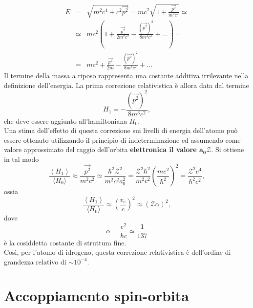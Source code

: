 \begin{eqnarray} 
E & = &\sqrt{m^2c^4+c^2\vec{p^2}}= mc^2 \sqrt{1+ \frac{\vec{p^2}}{m^2c^2}} \simeq \nonumber  \\
& \simeq & mc^2 \left( 1+ \frac{\vec{p^2}}{2m^2c^2}-\frac{(\vec{p^2})^2}{8m^4c^4}+\dots \right) = \nonumber  \\
& = & mc^2+\frac{\vec{p^2}}{2m}-\frac{(\vec{p^2})^2}{8m^3c^2}+ \dots 
\end{eqnarray}
Il termine della massa a riposo rappresenta una costante additiva irrilevante nella definizione dell'energia. La prima correzione relativistica è allora data dal termine 
\begin{equation} \label{eq:cap25_2}
H_1=-\frac{(\vec{p^2})^2}{8m^3c^2} ,
\end{equation}
che deve essere aggiunto all'hamiltoniana $H_0$. \\
Una stima dell'effetto di questa correzione sui livelli di energia dell'atomo può essere ottenuto utilizzando il principio di indeterminazione ed assumendo come valore approssimato del raggio dell'orbita \textbf{elettronica il valore $\boldsymbol{a_0\mathcal{Z}}$}. Si ottiene in tal modo
\begin{equation} 
\frac{\left< H_1 \right>}{\langle H_0 \rangle} \approx \frac{\vec{p^2}}{m^2c^2} \simeq \frac{\hbar^2 \mathcal{Z}^2}{m^2c^2a_0^2}=\frac{\mathcal{Z}^2 \hbar^2}{m^2c^2} \left( \frac{me^2}{\hbar^2}\right)^2=\frac{\mathcal{Z}^2 e^4}{\hbar^2 c^2} ,
\end{equation}
ossia
\begin{equation} 
\frac{\left< H_1 \right>}{\langle H_0 \rangle} \approx \left( \frac{v_e}{c} \right)^2 \approx \left(  \mathcal{Z} \alpha \right)^2 ,
\end{equation}
dove
\begin{equation} 
\alpha=\frac{e^2}{\hbar c} \simeq \frac{1}{137}
\end{equation}
è la cosiddetta costante di struttura fine. \\ Così, per l'atomo di idrogeno, questa correzione relativistica è dell'ordine di grandezza relativo di $\sim10^{-4}$.
\section{Accoppiamento spin-orbita}

